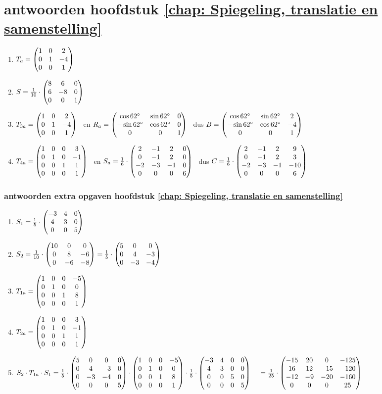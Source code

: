 \section{antwoorden  hoofdstuk \ref{chap: Spiegeling, translatie en samenstelling}}
\begin{enumerate}
	\item $ T_a = \begin{pmatrix} 1&0&2 \\ 0&1&-4 \\ 0&0&1 \end{pmatrix} $ 
	
	\item $   S = \frac{1}{10} \cdot\begin{pmatrix} 8&6&0 \\ 6&-8&0 \\ 0&0&1 \end{pmatrix}  $ 
	
	\item $ T_{3a} = \begin{pmatrix} 1&0&2 \\ 0&1&-4 \\ 0&0&1 \end{pmatrix} $ 
	\ en $ R_a= \begin{pmatrix} \cos 62 \degree &\sin 62 \degree&0 \\ -\sin 62 \degree&\cos 62 \degree&0 \\ 0&0&1 \end{pmatrix} $ 
	\ dus $ B= \begin{pmatrix} \cos 62 \degree &\sin 62 \degree&2 \\ -\sin 62 \degree&\cos 62 \degree&-4 \\ 0&0&1 \end{pmatrix} $ 
	
	
	\item $ T_{4a} = \begin{pmatrix} 1&0&0&3 \\ 0&1&0&-1 \\ 0&0&1&1 \\ 0&0&0&1 \end{pmatrix} $
	\ en $ S_a= \frac{1}{6}\cdot\begin{pmatrix} 2&-1&2&0 \\ 0&-1&2&0 \\ -2&-3&-1&0 \\ 0&0&0&6 \end{pmatrix} $
	\ dus $ C = \frac{1}{6}\cdot \begin{pmatrix} 2&-1&2&9 \\ 0&-1&2&3 \\ -2&-3&-1&-10 \\ 0&0&0&6 \end{pmatrix} $
	
	
\end{enumerate}

\subsubsection{antwoorden extra opgaven hoofdstuk \ref{chap: Spiegeling, translatie en samenstelling}}
\begin{enumerate}
	\item $   S_1 = \frac{1}{5} \cdot\begin{pmatrix} -3&4&0 \\ 4&3&0 \\ 0&0&5 \end{pmatrix}  $ 
	\item $   S_2 = \frac{1}{10} \cdot\begin{pmatrix} 10&0&0 \\ 0&8&-6 \\ 0&-6&-8 \end{pmatrix}  
	= \frac{1}{5} \cdot \begin{pmatrix} 5&0&0 \\ 0&4&-3 \\ 0&-3&-4 \end{pmatrix}  $ 
	
	\item $ T_{1a} = \begin{pmatrix} 1&0&0&-5 \\ 0&1&0&0 \\ 0&0&1&8 \\ 0&0&0&1 \end{pmatrix} $
	\item $ T_{2a} = \begin{pmatrix} 1&0&0&3 \\ 0&1&0&-1 \\ 0&0&1&1 \\ 0&0&0&1 \end{pmatrix} $
	\item $ S_2 \cdot T_{1a} \cdot S_1 = \frac{1}{5} \cdot\begin{pmatrix} 5&0&0&0 \\ 0&4&-3&0 \\ 0&-3&-4&0 \\ 0&0&0&5 \end{pmatrix} \cdot 
	\begin{pmatrix} 1&0&0&-5 \\ 0&1&0&0 \\ 0&0&1&8 \\ 0&0&0&1 \end{pmatrix} \cdot 
	\frac{1}{5} \cdot	\begin{pmatrix} -3&4&0&0 \\ 4&3&0&0 \\ 0&0&5&0 \\ 0&0&0&5 \end{pmatrix} \\
	\quad	= \frac{1}{25} \cdot	\begin{pmatrix} -15&20&0&-125 \\ 16&12&-15&-120 \\ -12&-9&-20&-160 \\ 0&0&0&25 \end{pmatrix} 
	$
	
\end{enumerate}

